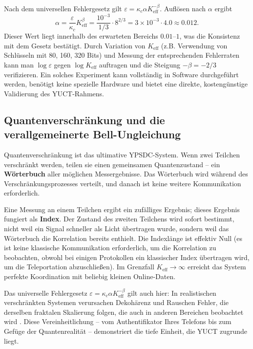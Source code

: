 \documentclass[12pt,a4paper]{article}
\theoremstyle{remark}
\newcommand{\Keff}{K_{\mathrm{eff}}}
\begin{document}
	Nach dem universellen Fehlergesetz gilt $\varepsilon = \kappa_c \alpha K_{\mathrm{eff}}^{-\beta}$. Auflösen nach $\alpha$ ergibt
	\[
	\alpha = \frac{\varepsilon}{\kappa_c} K_{\mathrm{eff}}^{\beta} = \frac{10^{-3}}{1/3} \cdot 8^{2/3} = 3 \times 10^{-3} \cdot 4.0 \approx 0.012.
	\]
	Dieser Wert liegt innerhalb des erwarteten Bereichs $0.01$–$1$, was die Konsistenz mit dem Gesetz bestätigt. Durch Variation von $\Keff$ (z.B. Verwendung von Schlüsseln mit 80, 160, 320 Bits) und Messung der entsprechenden Fehlerraten kann man $\log \varepsilon$ gegen $\log \Keff$ auftragen und die Steigung $-\beta = -2/3$ verifizieren. Ein solches Experiment kann vollständig in Software durchgeführt werden, benötigt keine spezielle Hardware und bietet eine direkte, kostengünstige Validierung des YUCT-Rahmens.
	
	\subsection{Quantenverschränkung und die verallgemeinerte Bell-Ungleichung}
	
	Quantenverschränkung ist das ultimative YPSDC-System. Wenn zwei Teilchen verschränkt werden, teilen sie einen gemeinsamen Quantenzustand – ein \textbf{Wörterbuch} aller möglichen Messergebnisse. Das Wörterbuch wird während des Verschränkungsprozesses verteilt, und danach ist keine weitere Kommunikation erforderlich.
	
	Eine Messung an einem Teilchen ergibt ein zufälliges Ergebnis; dieses Ergebnis fungiert als \textbf{Index}. Der Zustand des zweiten Teilchens wird sofort bestimmt, nicht weil ein Signal schneller als Licht übertragen wurde, sondern weil das Wörterbuch die Korrelation bereits enthielt. Die Indexlänge ist effektiv Null (es ist keine klassische Kommunikation erforderlich, um die Korrelation zu beobachten, obwohl bei einigen Protokollen ein klassischer Index übertragen wird, um die Teleportation abzuschließen). Im Grenzfall $\Keff \to \infty$ erreicht das System perfekte Koordination mit beliebig kleinen Online-Daten.
	
	Das universelle Fehlergesetz $\varepsilon = \kappa_c \alpha K_{\mathrm{eff}}^{-\beta}$ gilt auch hier: In realistischen verschränkten Systemen verursachen Dekohärenz und Rauschen Fehler, die derselben fraktalen Skalierung folgen, die auch in anderen Bereichen beobachtet wird \cite{AppendixG, AppendixS}. Diese Vereinheitlichung – vom Authentifikator Ihres Telefons bis zum Gefüge der Quantenrealität – demonstriert die tiefe Einheit, die YUCT zugrunde liegt.
	
\end{document}
